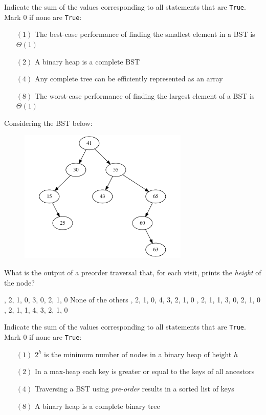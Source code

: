 \documentclass[12pt,addpoints]{exam}
\begin{document}
\pagebreak

\begin{questions}

\question[5] 
Indicate the sum of the values corresponding to all statements that are \verb|True|.  Mark $0$ if none are \verb|True|:
\begin{itemize}
	\item[$(1)$] The best-case performance of finding the smallest element in a BST is $\Theta(1)$
	\item[$(2)$] A binary heap is a complete BST
	\item[$(4)$] Any complete tree can be efficiently represented as an array
	\item[$(8)$] The worst-case performance of finding the largest element of a BST is $\Theta(1)$\end{itemize}
\answerline

\question[5] Considering the BST below:
\begin{figure}[h!]
  \centering
  \includegraphics[height=2.5in]{imgs/bst.pdf}
\end{figure}

What is the output of a preorder traversal that, for each visit, prints the {\it height} of the node?
\begin{choices}	
	, 2, 1, 0, 3, 0, 2, 1, 0	
	\choice None of the others	
	, 2, 1, 0, 4, 3, 2, 1, 0	
	, 2, 1, 1, 3, 0, 2, 1, 0	
	, 2, 1, 1, 4, 3, 2, 1, 0
\end{choices}
\answerline

\question[5] 
Indicate the sum of the values corresponding to all statements that are \verb|True|.  Mark $0$ if none are \verb|True|:
\begin{itemize}
	\item[$(1)$] $2^h$ is the minimum number of nodes in a binary heap of height $h$
	\item[$(2)$] In a max-heap each key is greater or equal to the keys of all ancestors
	\item[$(4)$] Traversing a BST using {\it pre-order} results in a sorted list of keys
	\item[$(8)$] A binary heap is a complete binary tree\end{itemize}
\answerline


\end{questions}
\end{document}
